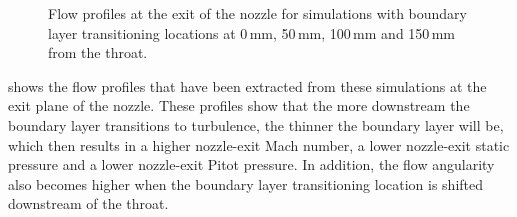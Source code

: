 \documentclass[12pt,a4paper]{article}
\begin{document}
\begin{figure}[htbp]
\begin{center}
{   \label{f:nozzle-exit-Pitot-pressure-effects-BL-trans}
  }
  \caption{Flow profiles at the exit of the nozzle for simulations with
           boundary layer transitioning locations at 0\,mm, 50\,mm, 
           100\,mm and 150\,mm from the throat.}
  \label{f:nozzle-exit-profiles-effects-BL-trans}
 \end{center}
\end{figure}
% 
shows the flow profiles that have been extracted from these simulations at the exit 
plane of the nozzle. These profiles show that the more downstream the boundary layer 
transitions to turbulence, the thinner the boundary layer will be, which then 
results in a higher nozzle-exit Mach number, a lower nozzle-exit static pressure and 
a lower nozzle-exit Pitot pressure. In addition, the flow angularity also becomes 
higher when the boundary layer transitioning location is shifted downstream of the 
throat.
\end{document}
